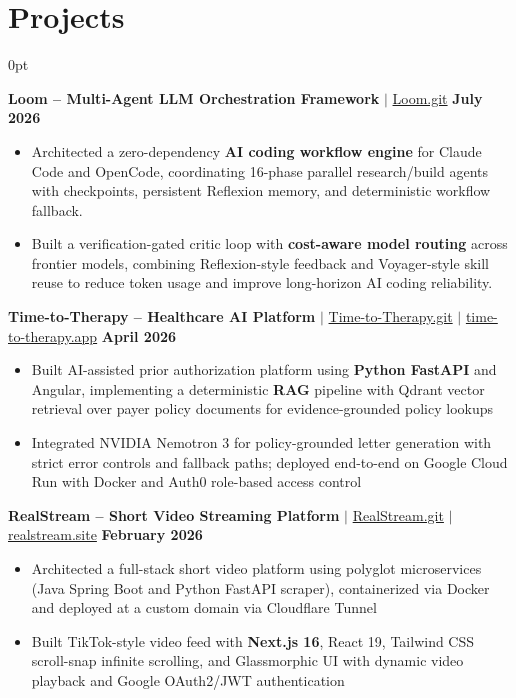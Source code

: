 \documentclass[letterpaper,10pt]{article}
\newlength{\contentindent}
\newcommand{\sectioncontent}[1]{%
  \begin{adjustwidth}{\contentindent}{0pt}%
  #1%
  \end{adjustwidth}%
}
\begin{document}
\section{Projects}
\sectioncontent{

\textbf{Loom -- Multi-Agent LLM Orchestration Framework} $|$
\href{https://github.com/Saurav-Kalaskar/loom}{Loom.git} \hfill \textbf{July 2026}
\begin{itemize}
\item Architected a zero-dependency \textbf{AI coding workflow engine} for Claude Code and OpenCode, coordinating 16-phase parallel research/build agents with checkpoints, persistent Reflexion memory, and deterministic workflow fallback.
\item Built a verification-gated critic loop with \textbf{cost-aware model routing} across frontier models, combining Reflexion-style feedback and Voyager-style skill reuse to reduce token usage and improve long-horizon AI coding reliability.
\end{itemize}

\textbf{Time-to-Therapy -- Healthcare AI Platform} $|$
\href{https://github.com/Saurav-Kalaskar/Time-to-Therapy}{Time-to-Therapy.git} $|$
\href{https://time-to-therapy-4todzcphia-uc.a.run.app}{time-to-therapy.app} \hfill \textbf{April 2026}
\begin{itemize}
    \item Built AI-assisted prior authorization platform using \textbf{Python FastAPI} and Angular, implementing a deterministic \textbf{RAG} pipeline with Qdrant vector retrieval over payer policy documents for evidence-grounded policy lookups
    \item Integrated NVIDIA Nemotron 3 for policy-grounded letter generation with strict error controls and fallback paths; deployed end-to-end on Google Cloud Run with Docker and Auth0 role-based access control
\end{itemize}

\textbf{RealStream -- Short Video Streaming Platform} $|$
\href{https://github.com/Saurav-Kalaskar/RealStream}{RealStream.git} $|$
\href{https://realstream.site}{realstream.site} \hfill \textbf{February 2026}
\begin{itemize}
    \item Architected a full-stack short video platform using polyglot microservices (Java Spring Boot and Python FastAPI scraper), containerized via Docker and deployed at a custom domain via Cloudflare Tunnel
    \item Built TikTok-style video feed with \textbf{Next.js 16}, React 19, Tailwind CSS scroll-snap infinite scrolling, and Glassmorphic UI with dynamic video playback and Google OAuth2/JWT authentication
\end{itemize}

}
\end{document}
